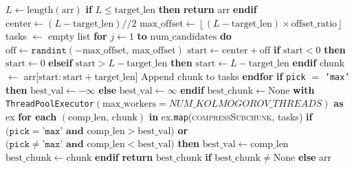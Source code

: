 \documentclass{article}
\theoremstyle{remark}
\begin{document}
\begin{algorithm}[H]
\caption{Kolmogorov-based Crop}
\begin{algorithmic}[1]
    \State $L \gets \mathrm{length}(\mathrm{arr})$
    \State \textbf{if} $L \leq \mathrm{target\_len}$ \textbf{then}
        \State \quad \textbf{return} arr
    \State \textbf{endif}
    \State $\mathrm{center} \gets (L - \mathrm{target\_len}) // 2$
    \State $\mathrm{max\_offset} \gets \left\lfloor (L - \mathrm{target\_len})\times \mathrm{offset\_ratio} \right\rfloor$
    \State tasks $\gets$ empty list
    \State \textbf{for} $j \gets 1$ \textbf{to} $\mathrm{num\_candidates}$ \textbf{do}
        \State \quad $\mathrm{off} \gets \texttt{randint}(-\mathrm{max\_offset},\, \mathrm{max\_offset})$
        \State \quad $\mathrm{start} \gets \mathrm{center} + \mathrm{off}$
        \State \quad \textbf{if} $\mathrm{start} < 0$ \textbf{then}
            \State \qquad $\mathrm{start} \gets 0$
        \State \quad \textbf{elseif} $\mathrm{start} > L - \mathrm{target\_len}$ \textbf{then}
            \State \qquad $\mathrm{start} \gets L - \mathrm{target\_len}$
        \State \quad \textbf{endif}
        \State \quad chunk $\gets$ arr[$\mathrm{start} : \mathrm{start} + \mathrm{target\_len}$]
        \State \quad Append $\mathrm{chunk}$ to tasks
    \State \textbf{endfor}
    \State \textbf{if} \texttt{pick} $=$ \texttt{'max'} \textbf{then}
        \State \quad $\mathrm{best\_val} \gets -\infty$
    \State \textbf{else}
        \State \quad $\mathrm{best\_val} \gets \infty$
    \State \textbf{endif}
    \State $\mathrm{best\_chunk} \gets \mathrm{None}$
    \State \textbf{with} \texttt{ThreadPoolExecutor}$(\mathrm{max\_workers} = \textit{NUM\_KOLMOGOROV\_THREADS})$ \textbf{as} ex
        \State \quad \textbf{for each} $(\mathrm{comp\_len},\, \mathrm{chunk})$ \textbf{in} ex.\texttt{map}(\textsc{compressSubchunk}, tasks)
            \State \qquad \textbf{if} $\bigl(\texttt{pick} = \texttt{'max'} \textbf{ and } \mathrm{comp\_len} > \mathrm{best\_val}\bigr)$ \textbf{or}
            \State \qquad\qquad $\bigl(\texttt{pick} \neq \texttt{'max'} \textbf{ and } \mathrm{comp\_len} < \mathrm{best\_val}\bigr)$ \textbf{then}
                \State \qquad\quad $\mathrm{best\_val} \gets \mathrm{comp\_len}$
                \State \qquad\quad $\mathrm{best\_chunk} \gets \mathrm{chunk}$
            \State \qquad \textbf{endif}
    \State \textbf{return} $\mathrm{best\_chunk}$ \textbf{if} $\mathrm{best\_chunk} \neq \mathrm{None}$ \textbf{else} arr
\EndProcedure
\end{algorithmic}
\end{algorithm}
\end{document}
